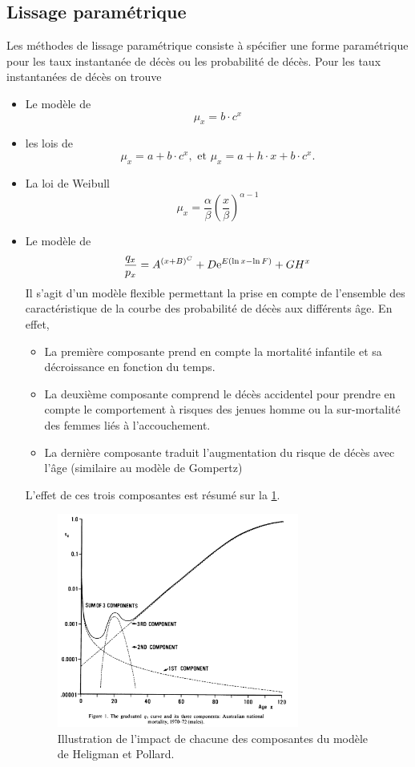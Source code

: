 \subsection{Lissage paramétrique}
Les méthodes de lissage paramétrique consiste à spécifier une forme paramétrique pour les taux instantanée de décès ou les probabilité de décès. Pour les taux instantanées de décès on trouve
\begin{itemize}
\item Le modèle de \citet{1825}
$$
\mu_x = b\cdot c^x
$$
\item les lois de \citet{Makeham1860}
$$
\mu_x =a+ b\cdot c^x,\text{ et }\mu_x =a + h\cdot x+ b\cdot c^x.
$$
\item La loi de Weibull
$$
\mu_x =\frac{\alpha}{\beta}\left(\frac{x}{\beta}\right)^{\alpha - 1} 
$$
\item Le modèle de \citet{Heligman1980}
$$
\frac{q_x}{p_x} = A^{(x+B)^C}+D\mathrm{e}^{E(\ln x - \ln F)}+GH^x
$$
Il s'agit d'un modèle flexible permettant la prise en compte de l'ensemble des caractéristique de la courbe des probabilité de décès aux différents âge. En effet,
\begin{itemize}
  \item La première composante prend en compte la mortalité infantile et sa décroissance en fonction du temps.
  \item La deuxième composante comprend le décès accidentel pour prendre en compte le comportement à risques des jenues homme ou la sur-mortalité des femmes liés à l'accouchement. 
  \item La dernière composante traduit l'augmentation du risque de décès avec l'âge (similaire au modèle de Gompertz)
\end{itemize}
L'effet de ces trois composantes est résumé sur la \cref{fig:Helgman_pollard_model}.
\begin{figure}[h!]
\centering
\includegraphics[width = 0.75\textwidth]{../figures/Helgman_pollard_model.png}
\caption{Illustration de l'impact de chacune des composantes du modèle de Heligman et Pollard.}
\label{fig:Helgman_pollard_model}
\end{figure}
\end{itemize}
